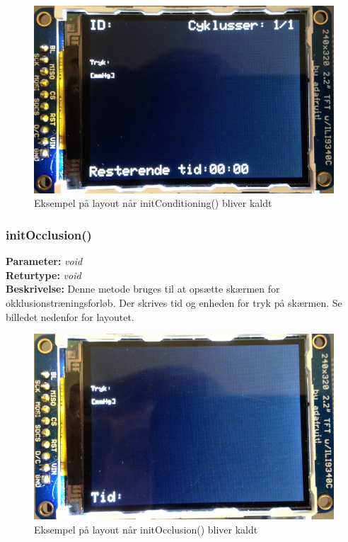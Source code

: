 \begin{figure}[H]
	\includegraphics[width=\textwidth]{billeder/conditioning.png}
	\caption{Eksempel på layout når initConditioning() bliver kaldt}\label{pic:conditiong}
\end{figure}

\subsubsection{initOcclusion()}
\textbf{Parameter: } \textit{void}
\\ \textbf{Returtype: } \textit{void}
\\ \textbf{Beskrivelse: }  Denne metode bruges til at opsætte skærmen for okklusionstræningsforløb. Der skrives tid og enheden for tryk på skærmen. Se billedet nedenfor for layoutet. 

\begin{figure}[H]
	\includegraphics[width=\textwidth]{billeder/occlusion.png}
	\caption{Eksempel på layout når initOcclusion() bliver kaldt}\label{pic:occlusion}
\end{figure}

